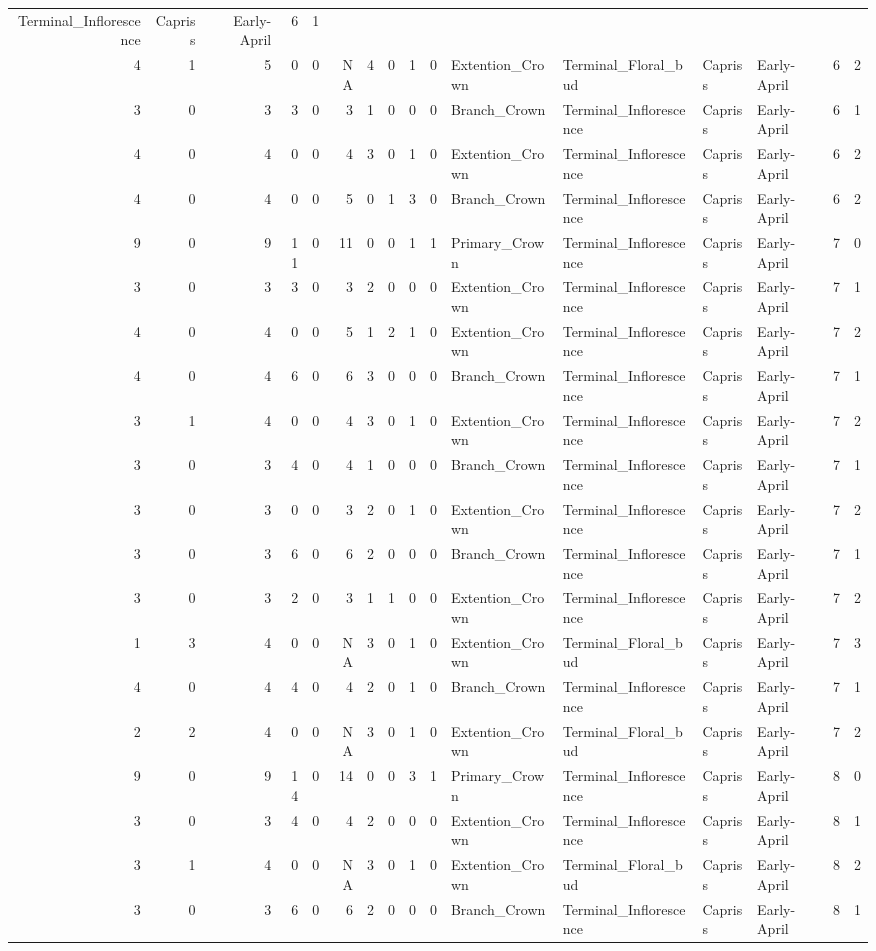 \documentclass[]{article}
\begin{document}
\begin{longtable}[]{@{}rrrrrrrrrrllllrl@{}}
Terminal\_Inflorescence & Capriss & Early-April & 6 & 1\tabularnewline
4 & 1 & 5 & 0 & 0 & NA & 4 & 0 & 1 & 0 & Extention\_Crown &
Terminal\_Floral\_bud & Capriss & Early-April & 6 & 2\tabularnewline
3 & 0 & 3 & 3 & 0 & 3 & 1 & 0 & 0 & 0 & Branch\_Crown &
Terminal\_Inflorescence & Capriss & Early-April & 6 & 1\tabularnewline
4 & 0 & 4 & 0 & 0 & 4 & 3 & 0 & 1 & 0 & Extention\_Crown &
Terminal\_Inflorescence & Capriss & Early-April & 6 & 2\tabularnewline
4 & 0 & 4 & 0 & 0 & 5 & 0 & 1 & 3 & 0 & Branch\_Crown &
Terminal\_Inflorescence & Capriss & Early-April & 6 & 2\tabularnewline
9 & 0 & 9 & 11 & 0 & 11 & 0 & 0 & 1 & 1 & Primary\_Crown &
Terminal\_Inflorescence & Capriss & Early-April & 7 & 0\tabularnewline
3 & 0 & 3 & 3 & 0 & 3 & 2 & 0 & 0 & 0 & Extention\_Crown &
Terminal\_Inflorescence & Capriss & Early-April & 7 & 1\tabularnewline
4 & 0 & 4 & 0 & 0 & 5 & 1 & 2 & 1 & 0 & Extention\_Crown &
Terminal\_Inflorescence & Capriss & Early-April & 7 & 2\tabularnewline
4 & 0 & 4 & 6 & 0 & 6 & 3 & 0 & 0 & 0 & Branch\_Crown &
Terminal\_Inflorescence & Capriss & Early-April & 7 & 1\tabularnewline
3 & 1 & 4 & 0 & 0 & 4 & 3 & 0 & 1 & 0 & Extention\_Crown &
Terminal\_Inflorescence & Capriss & Early-April & 7 & 2\tabularnewline
3 & 0 & 3 & 4 & 0 & 4 & 1 & 0 & 0 & 0 & Branch\_Crown &
Terminal\_Inflorescence & Capriss & Early-April & 7 & 1\tabularnewline
3 & 0 & 3 & 0 & 0 & 3 & 2 & 0 & 1 & 0 & Extention\_Crown &
Terminal\_Inflorescence & Capriss & Early-April & 7 & 2\tabularnewline
3 & 0 & 3 & 6 & 0 & 6 & 2 & 0 & 0 & 0 & Branch\_Crown &
Terminal\_Inflorescence & Capriss & Early-April & 7 & 1\tabularnewline
3 & 0 & 3 & 2 & 0 & 3 & 1 & 1 & 0 & 0 & Extention\_Crown &
Terminal\_Inflorescence & Capriss & Early-April & 7 & 2\tabularnewline
1 & 3 & 4 & 0 & 0 & NA & 3 & 0 & 1 & 0 & Extention\_Crown &
Terminal\_Floral\_bud & Capriss & Early-April & 7 & 3\tabularnewline
4 & 0 & 4 & 4 & 0 & 4 & 2 & 0 & 1 & 0 & Branch\_Crown &
Terminal\_Inflorescence & Capriss & Early-April & 7 & 1\tabularnewline
2 & 2 & 4 & 0 & 0 & NA & 3 & 0 & 1 & 0 & Extention\_Crown &
Terminal\_Floral\_bud & Capriss & Early-April & 7 & 2\tabularnewline
9 & 0 & 9 & 14 & 0 & 14 & 0 & 0 & 3 & 1 & Primary\_Crown &
Terminal\_Inflorescence & Capriss & Early-April & 8 & 0\tabularnewline
3 & 0 & 3 & 4 & 0 & 4 & 2 & 0 & 0 & 0 & Extention\_Crown &
Terminal\_Inflorescence & Capriss & Early-April & 8 & 1\tabularnewline
3 & 1 & 4 & 0 & 0 & NA & 3 & 0 & 1 & 0 & Extention\_Crown &
Terminal\_Floral\_bud & Capriss & Early-April & 8 & 2\tabularnewline
3 & 0 & 3 & 6 & 0 & 6 & 2 & 0 & 0 & 0 & Branch\_Crown &
Terminal\_Inflorescence & Capriss & Early-April & 8 & 1\tabularnewline

\end{longtable}
\end{document}
